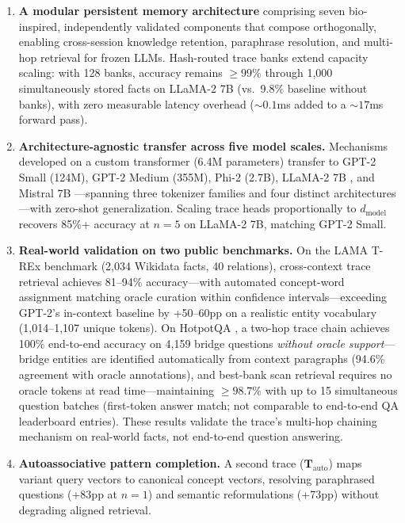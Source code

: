 \documentclass[11pt,a4paper]{article}
\begin{document}
\begin{enumerate}[leftmargin=*]
  \item \textbf{A modular persistent memory architecture} comprising seven bio-inspired, independently validated components that compose orthogonally, enabling cross-session knowledge retention, paraphrase resolution, and multi-hop retrieval for frozen LLMs. Hash-routed trace banks extend capacity scaling: with 128 banks, accuracy remains ${\geq}99\%$ through 1,000 simultaneously stored facts on LLaMA-2 7B (vs.\ 9.8\% baseline without banks), with zero measurable latency overhead (${\sim}0.1$ms added to a ${\sim}17$ms forward pass).

  \item \textbf{Architecture-agnostic transfer across five model scales.} Mechanisms developed on a custom transformer (6.4M parameters) transfer to GPT-2 Small (124M), GPT-2 Medium (355M), Phi-2 \citep{javaheripi2023phi} (2.7B), LLaMA-2 7B \citep{touvron2023llama}, and Mistral 7B \citep{jiang2023mistral}---spanning three tokenizer families and four distinct architectures---with zero-shot generalization. Scaling trace heads proportionally to $d_{\text{model}}$ recovers 85\%+ accuracy at $n{=}5$ on LLaMA-2 7B, matching GPT-2 Small.

  \item \textbf{Real-world validation on two public benchmarks.} On the LAMA T-REx benchmark (2,034 Wikidata facts, 40 relations), cross-context trace retrieval achieves 81--94\% accuracy---with automated concept-word assignment matching oracle curation within confidence intervals---exceeding GPT-2's in-context baseline by +50--60pp on a realistic entity vocabulary (1,014--1,107 unique tokens). On HotpotQA \citep{yang2018hotpotqa}, a two-hop trace chain achieves 100\% end-to-end accuracy on 4,159 bridge questions \emph{without oracle support}---bridge entities are identified automatically from context paragraphs (94.6\% agreement with oracle annotations), and best-bank scan retrieval requires no oracle tokens at read time---maintaining ${\geq}98.7\%$ with up to 15 simultaneous question batches (first-token answer match; not comparable to end-to-end QA leaderboard entries). These results validate the trace's multi-hop chaining mechanism on real-world facts, not end-to-end question answering.

  \item \textbf{Autoassociative pattern completion.} A second trace ($\mathbf{T}_{\text{auto}}$) maps variant query vectors to canonical concept vectors, resolving paraphrased questions (+83pp at $n{=}1$) and semantic reformulations (+73pp) without degrading aligned retrieval.


\end{enumerate}
\end{document}
